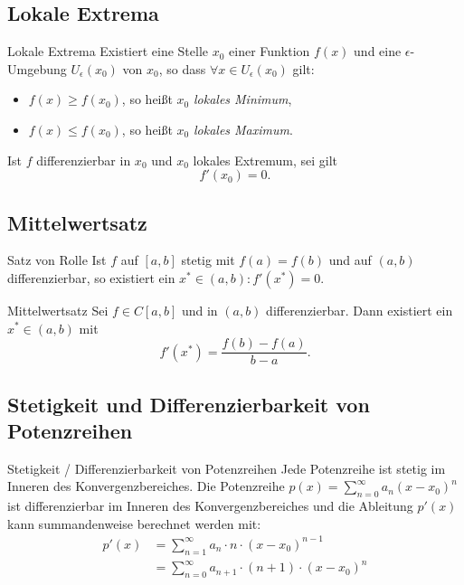 \documentclass[german]{../spicker}
\begin{document}
\subsection{Lokale Extrema}

\begin{defi}{Lokale Extrema}
    Existiert eine Stelle $x_0$ einer Funktion $f(x)$ und eine $\epsilon$-Umgebung $U_\epsilon (x_0)$ von $x_0$, so dass $\forall x \in U_\epsilon (x_0)$ gilt:
    \begin{itemize}
        \item $f(x) \geq f(x_0)$, so heißt $x_0$ \emph{lokales Minimum},
        \item $f(x) \leq f(x_0)$, so heißt $x_0$ \emph{lokales Maximum}.
    \end{itemize}

    Ist $f$ differenzierbar in $x_0$ und $x_0$ lokales Extremum, sei gilt
    $$
        f'(x_0) = 0.
    $$
\end{defi}

\subsection{Mittelwertsatz}

\begin{bonus}{Satz von Rolle}
    Ist $f$ auf $[a, b]$ stetig mit $f(a) = f(b)$ und auf $(a, b)$ differenzierbar, so existiert ein $x^* \in (a, b) : f'(x^*) = 0$.
\end{bonus}

\begin{defi}{Mittelwertsatz}
    Sei $f \in C[a, b]$ und in $(a, b)$ differenzierbar.
    Dann existiert ein $x^* \in (a, b)$ mit
    $$
        f'(x^*) = \frac{f(b)  -f(a)}{b-a}.
    $$
\end{defi}

\subsection{Stetigkeit und Differenzierbarkeit von Potenzreihen}

\begin{defi}{Stetigkeit / Differenzierbarkeit von Potenzreihen}
    Jede Potenzreihe ist stetig im Inneren des Konvergenzbereiches.
    Die Potenzreihe $p(x) = \sum^\infty_{n=0} a_n(x-x_0)^n$ ist differenzierbar im Inneren des Konvergenzbereiches und die Ableitung $p'(x)$ kann summandenweise berechnet werden mit:
    $$
        \begin{aligned}
            p'(x) & = \sum^\infty_{n=1} a_n \cdot n \cdot (x-x_0)^{n-1}       \\
                  & = \sum^\infty_{n=0} a_{n+1} \cdot (n+1) \cdot (x-x_0)^{n}
        \end{aligned}
    $$
\end{defi}
\end{document}

